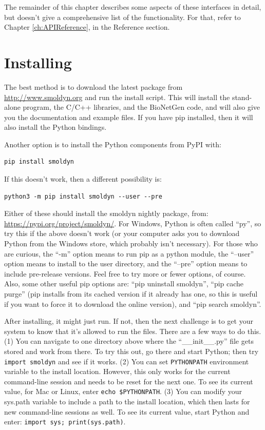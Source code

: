 \documentclass {scrbook}
\newcommand {\ttt} {\texttt}
\begin{document}
The remainder of this chapter describes some aspects of these interfaces in detail, but doesn't give a comprehensive list of the functionality. For that, refer to Chapter \ref{ch:APIReference}, in the Reference section.

\section{Installing}

The best method is to download the latest package from \url{http://www.smoldyn.org} and run the install script. This will install the stand-alone program, the C/C++ libraries, and the BioNetGen code, and will also give you the documentation and example files. If you have pip installed, then it will also install the Python bindings.

Another option is to install the Python components from PyPI with:
\begin{lstlisting}[style=SSAC]
pip install smoldyn
\end{lstlisting}
If this doesn't work, then a different possibility is:
\begin{lstlisting}[style=SSAC]
python3 -m pip install smoldyn --user --pre
\end{lstlisting}
Either of these should install the smoldyn nightly package, from: \url{https://pypi.org/project/smoldyn/}. For Windows, Python is often called ``py'', so try this if the above doesn't work (or your computer asks you to download Python from the Windows store, which probably isn't necessary). For those who are curious, the ``-m'' option means to run pip as a python module, the ``--user'' option means to install to the user directory, and the ``--pre'' option means to include pre-release versions. Feel free to try more or fewer options, of course. Also, some other useful pip options are: ``pip uninstall smoldyn'', ``pip cache purge'' (pip installs from its cached version if it already has one, so this is useful if you want to force it to download the online version), and ``pip search smoldyn''.

After installing, it might just run. If not, then the next challenge is to get your system to know that it's allowed to run the files. There are a few ways to do this. (1) You can navigate to one directory above where the ``\_\_init\_\_.py'' file gets stored and work from there. To try this out, go there and start Python; then try \ttt{import smoldyn} and see if it works. (2) You can set \ttt{PYTHONPATH} environment variable to the install location. However, this only works for the current command-line session and needs to be reset for the next one. To see its current value, for Mac or Linux, enter \ttt{echo \$PYTHONPATH}. (3) You can modify your sys.path variable to include a path to the install location, which then lasts for new command-line sessions as well. To see its current value, start Python and enter: \ttt{import sys; print(sys.path)}.
\end{document}
